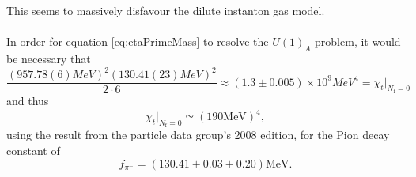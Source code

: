 \documentclass[a4paper,10pt]{article}
\begin{document}
This seems to massively disfavour the dilute instanton gas model.\\\\In order for equation \eqref{eq:etaPrimeMass} to resolve the $U(1)_A$ problem, it would be necessary that
\begin{equation}
\frac{(957.78(6)MeV)^2(130.41(23)MeV)^2}{2\cdot 6} \approx (1.3\pm 0.005)\times10^9 MeV^4 = \chi_{t}\big|_{N_{\mathrm{f}}=0}
\end{equation}
and thus
\begin{equation}
\chi_{t}\big|_{N_{\mathrm{f}}=0} \simeq(190 \mathrm{MeV})^{4},
\end{equation}
using the result from the particle data group's 2008 edition, for the Pion decay constant of \cite{https://doi.org/10.48550/arxiv.0802.1043}
\begin{equation}
f_{\pi^{-}}=(130.41 \pm 0.03 \pm 0.20) \mathrm{MeV}.
\end{equation}
\end{document}
